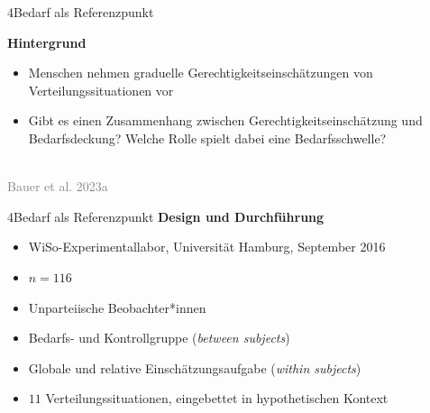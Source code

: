\documentclass[xcolor=table,9pt,aspectratio=169]{beamer}
\begin{document}
\begin{frame}{\vspace*{10mm}4\hspace*{1em}Bedarf als Referenzpunkt}
\begin{multicols}{2}
   \textbf{Hintergrund}\\
   \medskip
   \begin{itemize}
      \item Menschen nehmen graduelle Gerechtigkeitseinschätzungen von Verteilungssituationen vor
      \item Gibt es einen Zusammenhang zwischen Gerechtigkeitseinschätzung und Bedarfsdeckung? Welche Rolle spielt dabei eine Bedarfsschwelle?
   \end{itemize}
   \vfill
   \begin{center}
      \\
      \textcolor{gray}{Bauer et al. 2023a}
   \end{center}
\end{multicols}
\end{frame}


\begin{frame}{\vspace*{10mm}4\hspace*{1em}Bedarf als Referenzpunkt}
\textbf{Design und Durchführung}\\
\medskip
\begin{itemize}
   \item WiSo-Experimentallabor, Universität Hamburg, September 2016
   \item $n=116$
   \item Unparteiische Beobachter*innen
   \item Bedarfs- und Kontrollgruppe (\textit{between subjects})
   \item Globale und relative Einschätzungsaufgabe (\textit{within subjects})
   \item $11$ Verteilungssituationen, eingebettet in hypothetischen Kontext
\end{itemize}
\end{frame}
\end{document}

